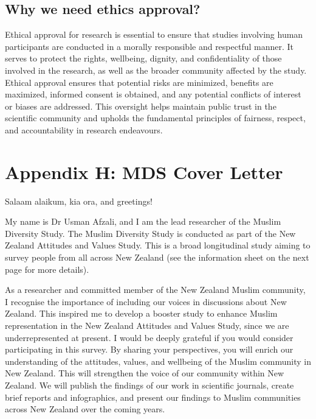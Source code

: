 \documentclass[
]{interact}
\begin{document}
\subsection{Why we need ethics
approval?}\label{why-we-need-ethics-approval}

\noindent Ethical approval for research is essential to ensure that
studies involving human participants are conducted in a morally
responsible and respectful manner. It serves to protect the rights,
wellbeing, dignity, and confidentiality of those involved in the
research, as well as the broader community affected by the study.
Ethical approval ensures that potential risks are minimized, benefits
are maximized, informed consent is obtained, and any potential conflicts
of interest or biases are addressed. This oversight helps maintain
public trust in the scientific community and upholds the fundamental
principles of fairness, respect, and accountability in research
endeavours.

\newpage{}

\section{Appendix H: MDS Cover
Letter}\label{appendix-h-mds-cover-letter}

\noindent Salaam alaikum, kia ora, and greetings!

\noindent My name is Dr Usman Afzali, and I am the lead researcher of
the Muslim Diversity Study. The Muslim Diversity Study is conducted as
part of the New Zealand Attitudes and Values Study. This is a broad
longitudinal study aiming to survey people from all across New Zealand
(see the information sheet on the next page for more details).

\noindent As a researcher and committed member of the New Zealand Muslim
community, I recognise the importance of including our voices in
discussions about New Zealand. This inspired me to develop a booster
study to enhance Muslim representation in the New Zealand Attitudes and
Values Study, since we are underrepresented at present. I would be
deeply grateful if you would consider participating in this survey. By
sharing your perspectives, you will enrich our understanding of the
attitudes, values, and wellbeing of the Muslim community in New Zealand.
This will strengthen the voice of our community within New Zealand. We
will publish the findings of our work in scientific journals, create
brief reports and infographics, and present our findings to Muslim
communities across New Zealand over the coming years.
\end{document}
